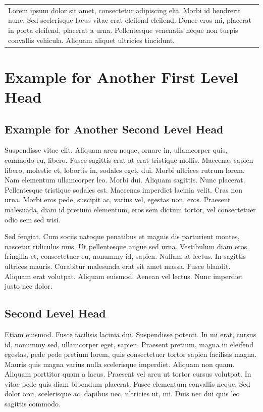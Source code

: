 \documentclass[ASNA,twocolumn]{USG} %
\begin{document}
\vspace{10pt}

{\setlength\arrayrulewidth{5pt}
\begin{tabular}{|p{230pt}}
Lorem ipsum dolor sit amet, consectetur adipiscing elit. Morbi id hendrerit nunc. Sed scelerisque lacus vitae erat eleifend eleifend. Donec eros mi, placerat in porta eleifend, placerat a urna. Pellentesque venenatis neque non turpis convallis vehicula. Aliquam aliquet ultricies tincidunt.
\end{tabular}}

\section{Example for Another First Level Head}\label{sec3}

\subsection{Example for Another Second Level Head}

Suspendisse vitae elit. Aliquam arcu neque, ornare in, ullamcorper quis, commodo eu, libero. Fusce sagittis erat at
erat tristique mollis. Maecenas sapien libero, molestie et, lobortis in, sodales eget, dui. Morbi ultrices rutrum lorem.
Nam elementum ullamcorper leo. Morbi dui. Aliquam sagittis. Nunc placerat. Pellentesque tristique sodales est.
Maecenas imperdiet lacinia velit. Cras non urna. Morbi eros pede, suscipit ac, varius vel, egestas non, eros. Praesent
malesuada, diam id pretium elementum, eros sem dictum tortor, vel consectetuer odio sem sed wisi.

Sed feugiat. Cum sociis natoque penatibus et magnis dis parturient montes, nascetur ridiculus mus. Ut pellentesque
augue sed urna. Vestibulum diam eros, fringilla et, consectetuer eu, nonummy id, sapien. Nullam at lectus. In sagittis
ultrices mauris. Curabitur malesuada erat sit amet massa. Fusce blandit. Aliquam erat volutpat. Aliquam euismod.
Aenean vel lectus. Nunc imperdiet justo nec dolor.

\subsection{Second Level Head}

Etiam euismod. Fusce facilisis lacinia dui. Suspendisse potenti. In mi erat, cursus id, nonummy sed, ullamcorper
eget, sapien. Praesent pretium, magna in eleifend egestas, pede pede pretium lorem, quis consectetuer tortor sapien
facilisis magna. Mauris quis magna varius nulla scelerisque imperdiet. Aliquam non quam. Aliquam porttitor quam
a lacus. Praesent vel arcu ut tortor cursus volutpat. In vitae pede quis diam bibendum placerat. Fusce elementum
convallis neque. Sed dolor orci, scelerisque ac, dapibus nec, ultricies ut, mi. Duis nec dui quis leo sagittis commodo.
\end{document}
